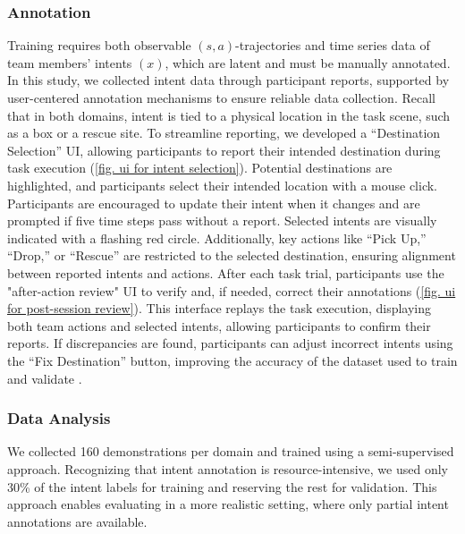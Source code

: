 \subsubsection{Annotation}
\label{sec: annotation}
Training \coach requires both observable $(s,a)$-trajectories and time series data of team members' intents $(x)$, which are latent and must be manually annotated. In this study, we collected intent data through participant reports, supported by user-centered annotation mechanisms to ensure reliable data collection.
Recall that in both domains, intent is tied to a physical location in the task scene, such as a box or a rescue site. To streamline reporting, we developed a ``Destination Selection'' UI, allowing participants to report their intended destination during task execution (\cref{fig. ui for intent selection}). Potential destinations are highlighted, and participants select their intended location with a mouse click. Participants are encouraged to update their intent when it changes and are prompted if five time steps pass without a report. Selected intents are visually indicated with a flashing red circle. Additionally, key actions like ``Pick Up,'' ``Drop,'' or ``Rescue'' are restricted to the selected destination, ensuring alignment between reported intents and actions. After each task trial, participants use the "after-action review" UI to verify and, if needed, correct their annotations (\cref{fig. ui for post-session review}). This interface replays the task execution, displaying both team actions and selected intents, allowing participants to confirm their reports. If discrepancies are found, participants can adjust incorrect intents using the ``Fix Destination'' button, improving the accuracy of the dataset used to train and validate \coach.

\subsubsection{Data Analysis}
\label{sec. learning team behavior model}
We collected 160 demonstrations per domain and trained \coach using a semi-supervised approach. Recognizing that intent annotation is resource-intensive, we used only 30\% of the intent labels for training and reserving the rest for validation. This approach enables evaluating \coach in a more realistic setting, where only partial intent annotations are available.